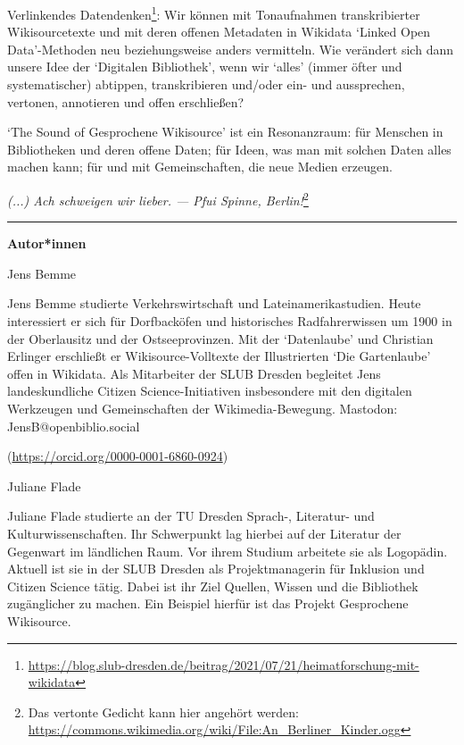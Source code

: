 \documentclass[a4paper,
fontsize=11pt,
oneside,
numbers=noperiodatend,
parskip=half-,
bibliography=totoc,
final
]{scrartcl}
\begin{document}
Verlinkendes Datendenken\footnote{\url{https://blog.slub-dresden.de/beitrag/2021/07/21/heimatforschung-mit-wikidata}}:
Wir können mit Tonaufnahmen transkribierter Wikisourcetexte und mit
deren offenen Metadaten in Wikidata \enquote*{Linked Open Data}-Methoden
neu beziehungsweise anders vermitteln. Wie verändert sich dann unsere
Idee der \enquote*{Digitalen Bibliothek}, wenn wir \enquote*{alles}
(immer öfter und systematischer) abtippen, transkribieren und/oder ein-
und aussprechen, vertonen, annotieren und offen erschließen?

\enquote*{The Sound of Gesprochene Wikisource} ist ein Resonanzraum: für
Menschen in Bibliotheken und deren offene Daten; für Ideen, was man mit
solchen Daten alles machen kann; für und mit Gemeinschaften, die neue
Medien erzeugen.

\begin{center}
\emph{(...) Ach schweigen wir lieber. --- Pfui Spinne, Berlin!}\footnote{Das vertonte Gedicht kann hier angehört werden: \url{https://commons.wikimedia.org/wiki/File:An\_Berliner\_Kinder.ogg}}
\end{center}

\begin{center}\rule{0.5\linewidth}{0.5pt}\end{center}

\textbf{Autor*innen}

Jens Bemme

Jens Bemme studierte Verkehrswirtschaft und Lateinamerikastudien. Heute interessiert er sich für Dorfbacköfen 
und historisches Radfahrerwissen um 1900 in der Oberlausitz und der Ostseeprovinzen. Mit der ‘Datenlaube’ und 
Christian Erlinger erschließt er Wikisource-Volltexte der Illustrierten ‘Die Gartenlaube’ offen in Wikidata. 
Als Mitarbeiter der SLUB Dresden begleitet Jens landeskundliche Citizen Science-Initiativen insbesondere mit 
den digitalen Werkzeugen und Gemeinschaften der Wikimedia-Bewegung. Mastodon: JensB@openbiblio.social

(\url{https://orcid.org/0000-0001-6860-0924})

Juliane Flade

Juliane Flade studierte an der TU Dresden Sprach-, Literatur- und Kulturwissenschaften. Ihr Schwerpunkt lag hierbei 
auf der Literatur der Gegenwart im ländlichen Raum. Vor ihrem Studium arbeitete sie als Logopädin. Aktuell ist sie 
in der SLUB Dresden als Projektmanagerin für Inklusion und Citizen Science tätig. Dabei ist ihr Ziel Quellen, Wissen 
und die Bibliothek zugänglicher zu machen. Ein Beispiel hierfür ist das Projekt Gesprochene Wikisource.
\end{document}
